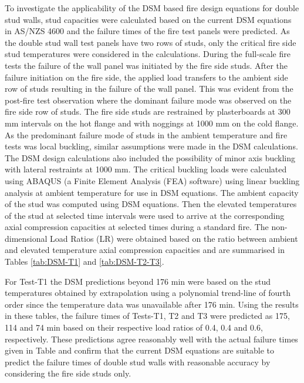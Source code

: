 To investigate the applicability of the DSM based fire design equations for double stud walls, stud capacities were calculated based on the current DSM equations in AS/NZS 4600 \citet{ASNZ4600} and the failure times of the fire test panels were predicted. As the double stud wall test panels have two rows of studs, only the critical fire side stud temperatures were considered in the calculations. During the full-scale fire tests the failure of the wall panel was initiated by the fire side studs. After the failure initiation on the fire side, the applied load transfers to the ambient side row of studs resulting in the failure of the wall panel. This was evident from the post-fire test observation where the dominant failure mode was observed on the fire side row of studs. The fire side studs are restrained by plasterboards at 300 mm intervals on the hot flange and with noggings at 1000 mm on the cold flange. As the predominant failure mode of studs in the ambient temperature and fire tests was local buckling, similar assumptions were made in the DSM calculations. The DSM design calculations also included the possibility of minor axis buckling with lateral restraints at 1000 mm. The critical buckling loads were calculated using ABAQUS (a Finite Element Analysis (FEA) software) using linear buckling analysis at ambient temperature for use in DSM equations. The ambient capacity of the stud was computed using DSM equations. Then the elevated temperatures of the stud at selected time intervals were used to arrive at the corresponding axial compression capacities at selected times during a standard fire. The non-dimensional Load Ratios (LR) were obtained based on the ratio between ambient and elevated temperature axial compression capacities and are summarised in Tables \ref{tab:DSM-T1} and \ref{tab:DSM-T2-T3}. 

For Test-T1 the DSM predictions beyond 176 min were based on the stud temperatures obtained by extrapolation using a polynomial trend-line of fourth order since the temperature data was unavailable after 176 min. Using the results in these tables, the failure times of Tests-T1, T2 and T3 were predicted as 175, 114 and 74 min based on their respective load ratios of 0.4, 0.4 and 0.6, respectively. These predictions agree reasonably well with the actual failure times given in Table and confirm that the current DSM equations are suitable to predict the failure times of double stud walls with reasonable accuracy by considering the fire side studs only.

